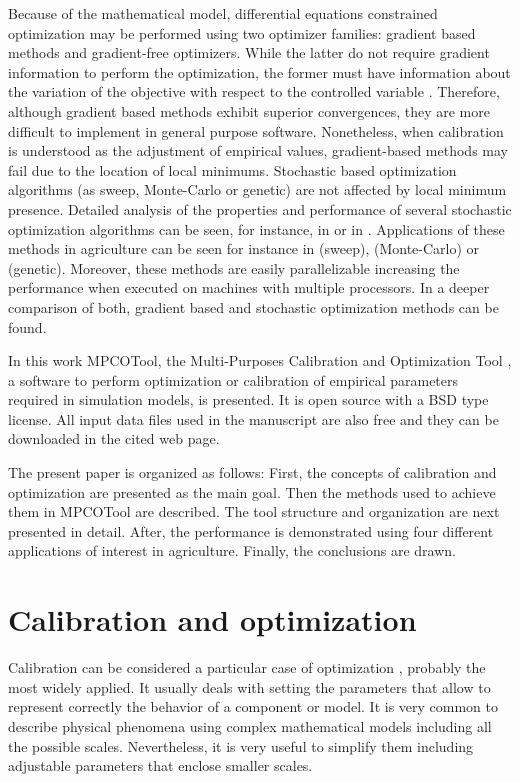 \documentclass[review,authoryear]{elsarticle}
\begin{document}
Because of the mathematical model, differential equations constrained
optimization may be performed using two optimizer families: gradient based
methods and gradient-free optimizers. While the latter do not require gradient
information to perform the optimization, the former must have information about
the variation of the objective with respect to the controlled variable
\citep{Lacasta15}. Therefore, although gradient based methods exhibit superior
convergences, they are more difficult to implement in general purpose software.
Nonetheless, when calibration is understood as the adjustment of empirical
values, gradient-based methods may fail due to the location of local minimums.
Stochastic based optimization algorithms (as sweep, Monte-Carlo or genetic) are
not affected by local minimum presence. 
Detailed analysis of the properties and performance of several stochastic
optimization algorithms can be seen, for instance, in \citet{Back96} or in
\citet{HauptHaupt04}.
Applications of these methods in
agriculture can be seen for instance in \citet{JaviSurcos2} (sweep),
\citet{Ouazaa15} (Monte-Carlo) or \citet{Ebrahimiam13} (genetic). Moreover,
these methods are easily parallelizable increasing the performance when executed
on machines with multiple processors. In \cite{Lacasta15} a deeper comparison of
both, gradient based and stochastic optimization methods can be found.

In this work MPCOTool, the Multi-Purposes Calibration and Optimization Tool
\citep{MPCOToolGit}, a software to perform
optimization or calibration of empirical parameters required in simulation
models, is presented. It is open source with a BSD type license. All input data
files used in the manuscript are also free and they can be downloaded in the
cited web page.

The present paper is organized as follows: First, the concepts of calibration
and optimization are presented as the main goal. Then the methods used to
achieve them in MPCOTool are described. The tool structure and organization
are next presented in detail. After, the performance is demonstrated using
four different applications of interest in agriculture. Finally, the conclusions
are drawn.

\section{Calibration and optimization}

Calibration can be considered a particular case of optimization
\citep{WrightNocedal99}, probably the most widely applied. It usually deals with
setting the parameters that allow to represent correctly the behavior of a
component or model. It is very common to describe physical phenomena using
complex mathematical models including all the possible scales. Nevertheless, it
is very useful to simplify them including adjustable parameters that enclose
smaller scales.
\end{document}
